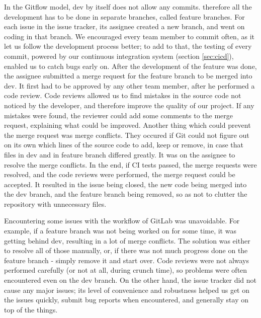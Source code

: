\documentclass{l3proj}
\begin{document}


In the Gitflow model, dev by itself does not allow any commits. therefore 
 all the development has to be done in separate branches, called feature 
 branches. For each issue in the issue tracker, its assignee created a 
 new branch, and went on coding in that branch. We encouraged every team 
 member to commit often, as it let us follow the development process better; 
 to add to that, the testing of every commit, powered by our continuous 
 integration system (section \ref{sec:cicd}), enabled us to catch bugs 
 early on. After the development of the feature was done, the assignee 
 submitted a merge request for the feature branch to be merged into dev. 
 It first had to be approved by any other team member, after he performed a 
 code review. Code reviews allowed us to find mistakes in the source code not 
 noticed by the developer, and therefore improve the quality of our project. 
 If any mistakes were found, the reviewer could add some comments to the merge 
 request, explaining what could be improved. Another thing which could 
 prevent the merge request was merge conflicts. They occured if Git could not 
 figure out on its own which lines of the source code to add, keep or 
 remove, in case that files in dev and in feature branch differed 
 greatly. It was on the assignee to resolve the merge conflicts. In 
 the end, if CI tests passed, the merge requests were resolved, and 
 the code reviews were performed, the merge request could be accepted. 
 It resulted in the issue being closed, the new code being merged into 
 the dev branch, and the feature branch being removed, so as not to 
 clutter the repository with unnecessary files.

Encountering some issues with the workflow of GitLab was unavoidable. 
 For example, if a feature branch was not being worked on for some time, 
 it was getting behind dev, resulting in a lot of merge conflicts. 
 The solution was either to resolve all of those manually, or, if 
 there was not much progress done on the feature branch - simply remove 
 it and start over. Code reviews were not always performed carefully 
 (or not at all, during crunch time), so problems were often encountered 
 even on the dev branch. On the other hand, the issue tracker did not 
 cause any major issues; its level of convenience and robustness helped 
 us get on the issues quickly, submit bug reports when encountered, 
 and generally stay on top of the things.
    

\end{document}
